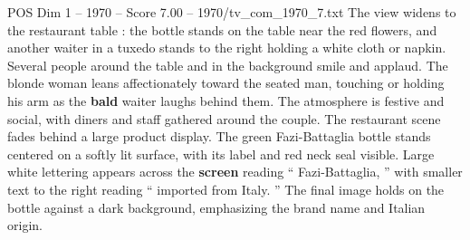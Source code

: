 \begin{textsample}{POS Dim 1 – 1970 – Score 7.00 – 1970/tv\_com\_1970\_7.txt}
The view widens to the restaurant table : the bottle stands on the table near the red flowers, and another waiter in a tuxedo stands to the right holding a white cloth or napkin.
Several people around the table and in the background smile and applaud.
The blonde woman leans affectionately toward the seated man, touching or holding his arm as the \textbf{bald} waiter laughs behind them.
The atmosphere is festive and social, with diners and staff gathered around the couple.
The restaurant scene fades behind a large product display.
The green Fazi-Battaglia bottle stands centered on a softly lit surface, with its label and red neck seal visible.
Large white lettering appears across the \textbf{screen} reading “ Fazi-Battaglia, ” with smaller text to the right reading “ imported from Italy. ” The final image holds on the bottle against a dark background, emphasizing the brand name and Italian origin.

\end{textsample}
